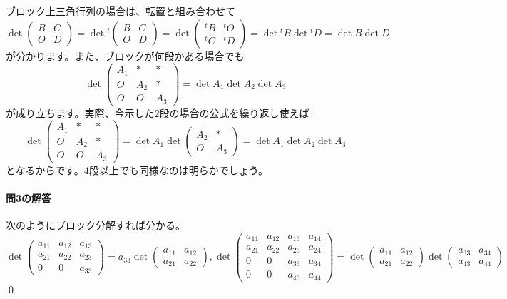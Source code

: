 ブロック上三角行列の場合は、転置と組み合わせて
\[
\det
\begin{pmatrix}
B & C \\
O & D
\end{pmatrix}
=
\det{}^t
\begin{pmatrix}
B & C \\
O & D
\end{pmatrix}
=
\det
\begin{pmatrix}
{}^t\!B & {}^tO \\
{}^tC & {}^tD
\end{pmatrix}
= \det {}^t\!B \det {}^tD
= \det B \det D
\]
が分かります。また、ブロックが何段かある場合でも
\[
\det
\begin{pmatrix}
A_1 & * & * \\
O & A_2 & * \\
O & O & A_3
\end{pmatrix}
= \det A_1 \det A_2 \det A_3
\]
が成り立ちます。実際、今示した$2$段の場合の公式を繰り返し使えば
\[
\det
\left(
\begin{array}{c|cc}
A_1 & * & * \\ \hline
O & A_2 & * \\
O & O & A_3
\end{array}
\right)
= \det A_1 
\det
\begin{pmatrix}
A_2 & * \\
O & A_3
\end{pmatrix}
= \det A_1 \det A_2 \det A_3
\]
となるからです。$4$段以上でも同様なのは明らかでしょう。

\paragraph{問3の解答} 次のようにブロック分解すれば分かる。
\[
\det
\left(
\begin{array}{cc|c}
a_{11} & a_{12} & a_{13} \\
a_{21} & a_{22} & a_{23} \\ \hline
0 & 0 & a_{33}
\end{array}
\right)
= a_{33} \det
\begin{pmatrix}
a_{11} & a_{12}\\
a_{21} & a_{22}
\end{pmatrix}, 
\det
\left(
\begin{array}{cc|cc}
a_{11} & a_{12} & a_{13} & a_{14} \\
a_{21} & a_{22} & a_{23} & a_{24} \\ \hline
0 & 0 & a_{33} & a_{34} \\
0 & 0 & a_{43} & a_{44}
\end{array}
\right)
= \det
\begin{pmatrix}
a_{11} & a_{12} \\
a_{21} & a_{22}
\end{pmatrix}
\det
\begin{pmatrix}
a_{33} & a_{34} \\
a_{43} & a_{44}
\end{pmatrix}
\]
\qed

